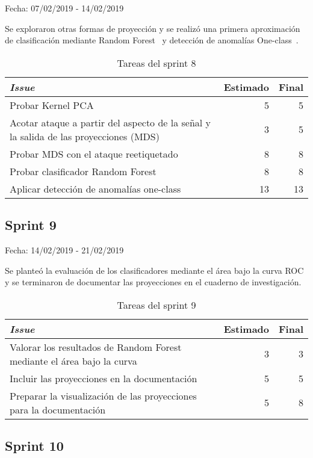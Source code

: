 Fecha: 07/02/2019 - 14/02/2019

Se exploraron otras formas de proyección y se realizó una primera aproximación de clasificación mediante Random Forest~\cite{RandomForest} y detección de anomalías One-class~\cite{OneClass}. 

\begin{table}[H]
	\begin{tabularx}{\textwidth}{Xrr}
		\toprule \textbf{\textit{Issue}} & \textbf{Estimado} & \textbf{Final}\\
		\toprule 
		Probar Kernel PCA & 5 & 5 \\
		Acotar ataque a partir del aspecto de la señal y la salida de las proyecciones (MDS) & 3 & 5 \\
		Probar MDS con el ataque reetiquetado & 8 & 8 \\
		Probar clasificador Random Forest & 8 & 8 \\
		Aplicar detección de anomalías one-class & 13 & 13 \\
		\bottomrule
	\end{tabularx}
	\caption{Tareas del sprint 8}
\end{table}


\subsection{Sprint 9}

Fecha: 14/02/2019 - 21/02/2019

Se planteó la evaluación de los clasificadores mediante el área bajo la curva ROC y se terminaron de documentar las proyecciones en el cuaderno de investigación. 

\begin{table}[H]
	\begin{tabularx}{\textwidth}{Xrr}
		\toprule \textbf{\textit{Issue}} & \textbf{Estimado} & \textbf{Final}\\
		\toprule 
		Valorar los resultados de Random Forest mediante el área bajo la curva & 3 & 3 \\
		Incluir las proyecciones en la documentación & 5 & 5 \\
		Preparar la visualización de las proyecciones para la documentación & 5 & 8 \\
		\bottomrule
	\end{tabularx}
	\caption{Tareas del sprint 9}
\end{table}

\subsection{Sprint 10}

